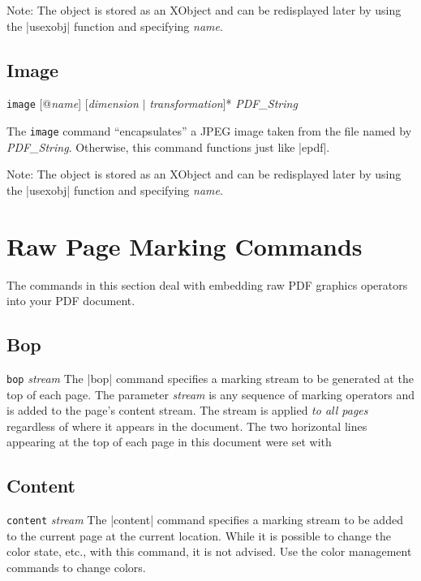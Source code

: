 {Note: The object is stored as an XObject and can be redisplayed later by using the
|usexobj| function and specifying {\it name}.

\example
\begintt
{}
\endtt

\subsection{Image}
\syntax
{\tt image} [@{\it name}] [{\it dimension} $\vert$ {\it transformation}]*  {\it PDF\_String}

\description
The {\tt image} command ``encapsulates'' a JPEG image
taken from the file named by {\it PDF\_String}.
Otherwise, this command functions just like |epdf|.

Note: The object is stored as an XObject and can be redisplayed later by using the
|usexobj| function and specifying {\it name}.

\section{Raw Page Marking Commands}
The commands in this section deal with embedding
raw PDF graphics operators into your PDF document.

\subsection{Bop}
\syntax
{\tt bop} {\it stream}
\description
The |bop| command specifies a marking
stream to be generated at the top of each page.
The parameter {\it stream} is any sequence
of marking operators and is added to the page's content stream.  
The stream is applied {\it to all pages} regardless
of where it appears in the document.
\example  The two horizontal lines appearing
at the top of each page in this document
were set with
\begintt
{}
\endtt
{}

\subsection{Content}
\syntax
{\tt content} {\it stream}
\description
The |content| command specifies a marking
stream to be added to the current page at
the current location.  While it
is possible to change the color
state, etc., with this command, it is
not advised.  Use the color management
commands to change colors.


}
